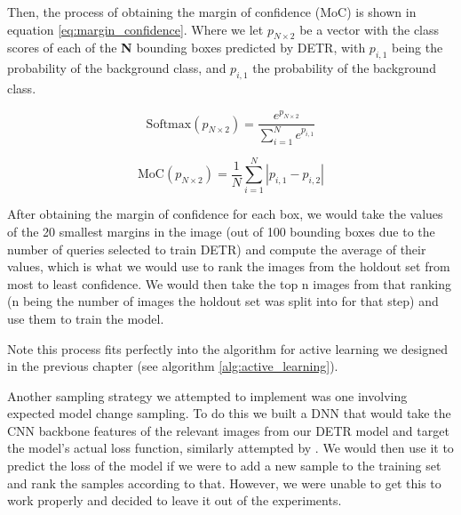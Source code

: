 \documentclass[../main.tex]{subfiles}
\begin{document}
    Then, the process of obtaining the margin of confidence (MoC) is shown in equation \ref{eq:margin_confidence}. Where we let $p_{N\times2}$ be a vector with the class scores of each of the \textbf{N} bounding boxes predicted by DETR, with $p_{i,1}$ being the probability of the background class, and $p_{i,1}$ the probability of the background class.


    \begin{equation}
        \text{Softmax}(p_{N\times2}) = \frac{e^{p_{N\times2}}}{\sum_{i=1}^{N} e^{p_{i,1}}}
        \label{eq:softmax}
    \end{equation}

    \begin{equation}
        \text{MoC}(p_{N\times2}) = \frac{1}{N} \sum_{i=1}^{N} |p_{i,1} - p_{i,2}|
        \label{eq:margin_confidence}
    \end{equation}

    After obtaining the margin of confidence for each box, we would take the values of the 20 smallest margins in the image (out of 100 bounding boxes due to the number of queries selected to train DETR) and compute the average of their values, which is what we would use to rank the images from the holdout set from most to least confidence. We would then take the top n images from that ranking (n being the number of images the holdout set was split into for that step) and use them to train the model.

    Note this process fits perfectly into the algorithm for active learning we designed in the previous chapter (see algorithm \ref{alg:active_learning}). 
    \clearpage

    Another sampling strategy we attempted to implement was one involving expected model change sampling. To do this we built a DNN that would take the CNN backbone features of the relevant images from our DETR model and target the model's actual loss function, similarly attempted by  \cite{yooLearningLossActive2019}. We would then use it to predict the loss of the model if we were to add a new sample to the training set and rank the samples according to that. However, we were unable to get this to work properly and decided to leave it out of the experiments.


\end{document}
